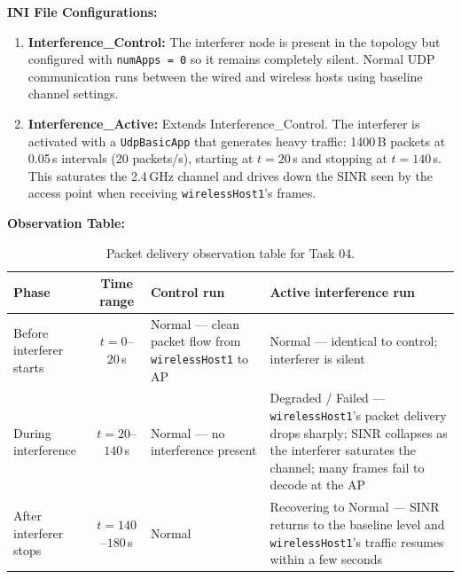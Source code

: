 \documentclass[12pt]{article}
\begin{document}
\textbf{INI File Configurations:}
\begin{enumerate}
    \item \textbf{Interference\_Control:} The interferer node is present in the
          topology but configured with \texttt{numApps = 0} so it remains
          completely silent. Normal UDP communication runs between the wired
          and wireless hosts using baseline channel settings.

    \item \textbf{Interference\_Active:} Extends Interference\_Control. The
          interferer is activated with a \texttt{UdpBasicApp} that generates
          heavy traffic: 1400\,B packets at 0.05\,s intervals (20 packets/s),
          starting at $t = 20$\,s and stopping at $t = 140$\,s. This saturates
          the 2.4\,GHz channel and drives down the SINR seen by the access point
          when receiving \texttt{wirelessHost1}'s frames.
\end{enumerate}

\textbf{Observation Table:}
\begin{table}[H]
    \centering
    \small
    \renewcommand{\arraystretch}{1.3}
    \begin{tabularx}{\linewidth}{|l|c|X|X|}
        \hline
        \textbf{Phase} & \textbf{Time range}
            & \textbf{Control run}
            & \textbf{Active interference run} \\
        \hline
        Before interferer starts & $t = 0$--$20$\,s &
            Normal --- clean packet flow from \texttt{wirelessHost1} to AP &
            Normal --- identical to control; interferer is silent \\
        \hline
        During interference & $t = 20$--$140$\,s &
            Normal --- no interference present &
            Degraded / Failed --- \texttt{wirelessHost1}'s packet delivery
            drops sharply; SINR collapses as the interferer saturates the
            channel; many frames fail to decode at the AP \\
        \hline
        After interferer stops & $t = 140$--$180$\,s &
            Normal &
            Recovering to Normal --- SINR returns to the baseline level and
            \texttt{wirelessHost1}'s traffic resumes within a few seconds \\
        \hline
    \end{tabularx}
    \caption{Packet delivery observation table for Task 04.}
    \label{tab:task4_obs}
\end{table}
\end{document}
